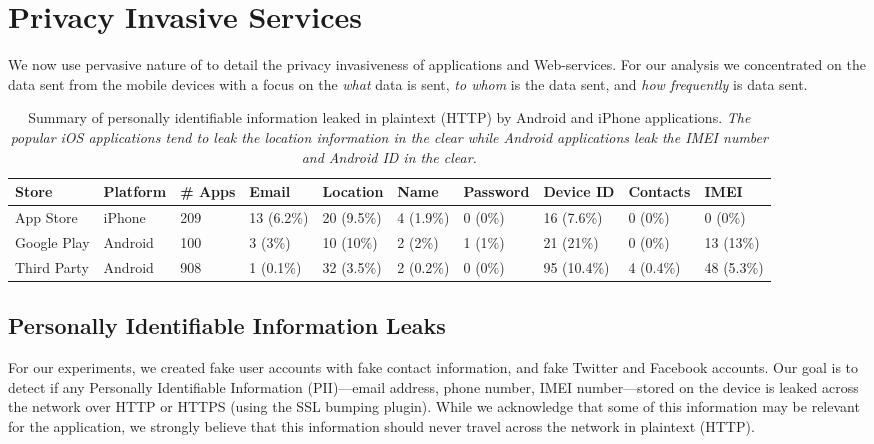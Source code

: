 \section{Privacy Invasive Services}
\label{sec:characterize-app}
We now use pervasive nature of \platname to detail  the privacy invasiveness of applications and Web-services. 
For our analysis we concentrated on the data sent from the mobile devices with a focus on the {\it what} data is sent,  {\it to whom} is the data sent, and {\it how frequently} is data sent.

\begin{table}[t]    
    \centering
    \begin{small}
    \begin{tabular}{|l|l|l|l|l|l|l|l|l|l|}
       \hline
       {\bf Store}&{\bf Platform}&{\bf \# Apps}&{\bf Email}& {\bf Location}& {\bf Name} &{\bf Password}& {\bf Device ID}& {\bf Contacts}& {\bf IMEI}\\
       \hline
       App Store&iPhone&209&13 (6.2\%) &20 (9.5\%)&4 (1.9\%)&0 (0\%)&16 (7.6\%)&0 (0\%)&0 (0\%)\\
       \hline
       Google Play&Android&100&3 (3\%)&10 (10\%)&2 (2\%)&1 (1\%)&21 (21\%)&0 (0\%)&13 (13\%)\\
       \hline
       Third Party&Android&908&1 (0.1\%)&32 (3.5\%)&2 (0.2\%)&0 (0\%)&95 (10.4\%)&4 (0.4\%)&48 (5.3\%)\\
       \hline
    \end{tabular}
    \end{small}
    \caption{Summary of personally identifiable information leaked in plaintext (HTTP) by Android and iPhone applications. \emph{The popular iOS applications tend to leak the location information in the clear while Android applications leak the IMEI number and Android ID in the clear.}}
    \label{tab:pii}
\end{table}

\subsection{Personally Identifiable Information Leaks}

For our experiments, we created fake user accounts with fake contact
information, and fake Twitter and Facebook accounts.  Our goal is to
detect if any Personally Identifiable Information (PII)---email
address, phone number, IMEI number---stored on the device is leaked
across the network over HTTP or HTTPS (using the SSL bumping plugin).
While we acknowledge that some of this information may be relevant for
the application, we strongly believe that this information should
never travel across the network in plaintext (HTTP).


